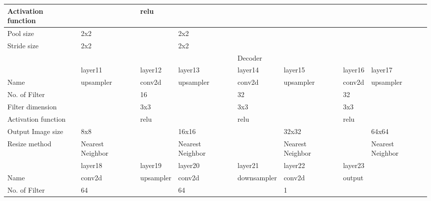 \documentclass[conference]{IEEEtran}
\begin{document}
\begin{table}[!t]
\begin{tabular}{llllllll}
		Activation function &                  & relu             &                  &                  &                  &                &                  \\ \hline
		Pool size           & 2x2              &                  & 2x2              &                  &                  &                &                  \\ \hline
		Stride size         & 2x2              &                  & 2x2              &                  &                  &                &                  \\ \hline
		&                  &                  &                  & Decoder          &                  &                &                  \\ \hline
		& layer11          & layer12          & layer13          & layer14          & layer15          & layer16        & layer17          \\ \hline
		Name                & upsampler        & conv2d           & upsampler        & conv2d           & upsampler        & conv2d         & upsampler        \\ \hline
		No. of Filter       &                  & 16               &                  & 32               &                  & 32             &                  \\ \hline
		Filter dimension    &                  & 3x3              &                  & 3x3              &                  & 3x3            &                  \\ \hline
		Activation function &                  & relu             &                  & relu             &                  & relu           &                  \\ \hline
		Output Image size   & 8x8              &                  & 16x16            &                  & 32x32            &                & 64x64            \\ \hline
		Resize method       & Nearest Neighbor &                  & Nearest Neighbor &                  & Nearest Neighbor &                & Nearest Neighbor \\ \hline
		& layer18          & layer19          & layer20          & layer21          & layer22          & layer23        &                  \\ \hline
		Name                & conv2d           & upsampler        & conv2d           & downsampler      & conv2d           & output         &                  \\ \hline
		No. of Filter       & 64               &                  & 64               &                  & 1                &                &                  \\ \hline

\end{tabular}
\end{table}
\end{document}
